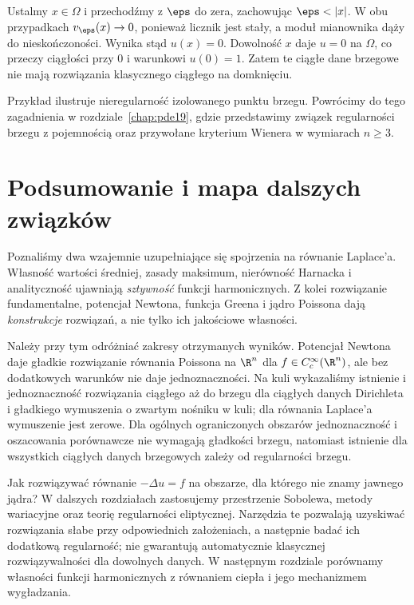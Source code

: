 Ustalmy $x\in\Omega$ i przechodźmy z $\eps$ do zera,
zachowując $\eps<|x|$. W obu przypadkach
$v_\eps(x)\to0$, ponieważ licznik jest stały,
a moduł mianownika dąży do nieskończoności.
Wynika stąd $u(x)=0$. Dowolność $x$ daje $u=0$
na $\Omega$, co przeczy ciągłości przy $0$ i warunkowi
$u(0)=1$. Zatem te ciągłe dane brzegowe nie
mają rozwiązania klasycznego ciągłego na domknięciu.

Przykład ilustruje nieregularność izolowanego
punktu brzegu. Powrócimy do tego zagadnienia
w rozdziale~\ref{chap:pde19}, gdzie przedstawimy
związek regularności brzegu z pojemnością oraz
przywołane kryterium Wienera w wymiarach $n\geq3$.

\section{Podsumowanie i mapa dalszych związków}
\label{sec:pde3-summary}

Poznaliśmy dwa wzajemnie uzupełniające się spojrzenia
na równanie Laplace'a. Własność wartości średniej,
zasady maksimum, nierówność Harnacka i analityczność
ujawniają \emph{sztywność} funkcji harmonicznych.
Z kolei rozwiązanie fundamentalne, potencjał Newtona,
funkcja Greena i jądro Poissona dają \emph{konstrukcje}
rozwiązań, a nie tylko ich jakościowe własności.

Należy przy tym odróżniać zakresy otrzymanych wyników.
Potencjał Newtona daje gładkie rozwiązanie równania
Poissona na $\R^n$ dla $f\in C_c^\infty(\R^n)$,
ale bez dodatkowych warunków nie daje jednoznaczności.
Na kuli wykazaliśmy istnienie i jednoznaczność
rozwiązania ciągłego aż do brzegu dla ciągłych danych
Dirichleta i gładkiego wymuszenia o zwartym nośniku
w kuli; dla równania Laplace'a wymuszenie jest zerowe.
Dla ogólnych ograniczonych obszarów jednoznaczność
i oszacowania porównawcze nie wymagają gładkości
brzegu, natomiast istnienie dla wszystkich ciągłych
danych brzegowych zależy od regularności brzegu.

Jak rozwiązywać równanie $-\Delta u=f$ na obszarze,
dla którego nie znamy jawnego jądra?
W dalszych rozdziałach zastosujemy przestrzenie
Sobolewa, metody wariacyjne oraz teorię regularności
eliptycznej. Narzędzia te pozwalają uzyskiwać
rozwiązania słabe przy odpowiednich założeniach,
a następnie badać ich dodatkową regularność;
nie gwarantują automatycznie klasycznej
rozwiązywalności dla dowolnych danych.
W następnym rozdziale porównamy własności funkcji
harmonicznych z równaniem ciepła i jego mechanizmem
wygładzania.

